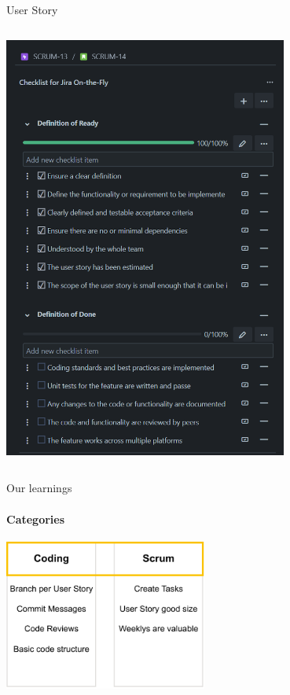 \documentclass[
    ngerman,%
    authorontitle=true,
]{bfhbeamer}
\begin{document}
\begin{frame}{User Story}
\begin{columns}
\begin{column}{0.4\textwidth}
\begin{center}
                    \includegraphics[width=0.7\textwidth]{pictures/user_story_2}
                \end{center}
            \end{column}
        \end{columns}
    \end{frame}

    \begin{frame}{Our learnings}
        \framesubtitle{Categories}
        \begin{center}
            \includegraphics[width=0.5\textwidth]{pictures/scrum_adaptions-learnings}
        \end{center}
    \end{frame}


\end{document}
